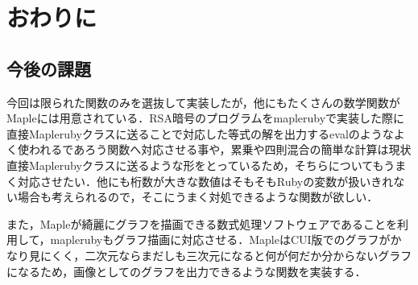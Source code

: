 \section{おわりに}
\subsection{今後の課題}
今回は限られた関数のみを選抜して実装したが，他にもたくさんの数学関数がMapleには用意されている．RSA暗号のプログラムをmaplerubyで実装した際に直接Maplerubyクラスに送ることで対応した等式の解を出力するevalのようなよく使われるであろう関数へ対応させる事や，累乗や四則混合の簡単な計算は現状直接Maplerubyクラスに送るような形をとっているため，そちらについてもうまく対応させたい．他にも桁数が大きな数値はそもそもRubyの変数が扱いきれない場合も考えられるので，そこにうまく対処できるような関数が欲しい．

また，Mapleが綺麗にグラフを描画できる数式処理ソフトウェアであることを利用して，maplerubyもグラフ描画に対応させる．MapleはCUI版でのグラフがかなり見にくく，二次元ならまだしも三次元になると何が何だか分からないグラフになるため，画像としてのグラフを出力できるような関数を実装する．

